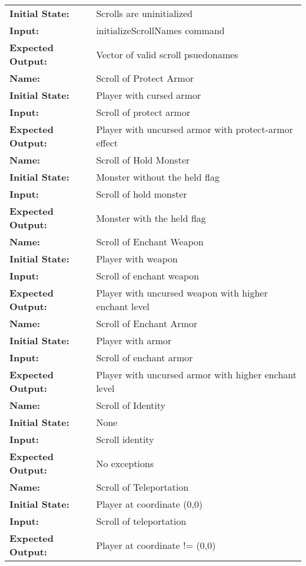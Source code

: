 \documentclass[12pt, titlepage]{article}
\begin{document}
\begin{center}
\begin{longtable}{ l | p{10cm} }
				\textbf{Initial State:} & Scrolls are uninitialized\\
				\textbf{Input:} & initializeScrollNames command\\
				\textbf{Expected Output:} & Vector of valid scroll psuedonames\\
				\hline
				\textbf{Name:} & Scroll of Protect Armor\\
				\textbf{Initial State:} & Player with cursed armor \\
				\textbf{Input:} & Scroll of protect armor\\
				\textbf{Expected Output:} & Player with uncursed armor with protect-armor effect\\
				\hline
				\textbf{Name:} & Scroll of Hold Monster\\
				\textbf{Initial State:} & Monster without the held flag\\
				\textbf{Input:} & Scroll of hold monster\\
				\textbf{Expected Output:} & Monster with the held flag\\
				\hline
				\textbf{Name:} & Scroll of Enchant Weapon\\
				\textbf{Initial State:} & Player with weapon\\
				\textbf{Input:} & Scroll of enchant weapon\\
				\textbf{Expected Output:} & Player with uncursed weapon with higher enchant level\\
				\hline
				\textbf{Name:} & Scroll of Enchant Armor\\
				\textbf{Initial State:} & Player with armor\\
				\textbf{Input:} & Scroll of enchant armor\\
				\textbf{Expected Output:} & Player with uncursed armor with higher enchant level\\
				\hline
				\textbf{Name:} & Scroll of Identity\\
				\textbf{Initial State:} & None\\
				\textbf{Input:} & Scroll identity\\
				\textbf{Expected Output:} & No exceptions\\
				\hline
				\textbf{Name:} & Scroll of Teleportation\\
				\textbf{Initial State:} & Player at coordinate (0,0)\\
				\textbf{Input:} & Scroll of teleportation\\
				\textbf{Expected Output:} & Player at coordinate != (0,0)\\

\end{longtable}
\end{center}
\end{document}
